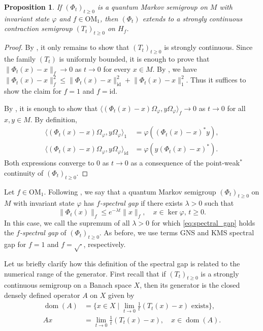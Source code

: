\documentclass[a4paper,12pt]{amsart}
\newcommand{\norm}[1]{\lVert#1\rVert}
\newcommand{\id}{\mathrm{id}}
\newcommand{\OM}{\mathrm{OM}}
\renewcommand{\phi}{\varphi}
\newcommand{\dom}{\operatorname{dom}}
\theoremstyle{plain}
\newtheorem{proposition}{Proposition}[section]
\theoremstyle{remark}
\theoremstyle{definition}
\begin{document}
\begin{proposition}\label{prop:C_0_ext}
    If $(\Phi_t)_{t\geq 0}$ is a quantum Markov semigroup on $M$ with invariant state $\phi$ and $f\in\OM_1$, then $(\Phi_t)$ extends to a strongly continuous contraction semigroup $(T_t)_{t\geq 0}$ on $H_f$.
\end{proposition}
\begin{proof}
    By , it only remains to show that $(T_t)_{t\geq 0}$ is strongly continuous. Since the family $(T_t)$ is uniformly bounded, it is enough to prove that $\norm{\Phi_t(x)-x}_f\to 0$ as $t\to 0$ for every $x\in M$. By , we have $\norm{\Phi_t(x)-x}_f^2\leq \norm{\Phi_t(x)-x}_{\id}^2+\norm{\Phi_t(x)-x}_{1}^2$. Thus it suffices to show the claim for $f=1$ and $f=\id$.

    By \cite[Theorem II.5.8]{EN00}, it is enough to show that $\langle (\Phi_t(x)-x)\Omega_\phi,y\Omega_\phi\rangle_f\to 0$ as $t\to 0$ for all $x,y\in M$. By definition, 
    \begin{align*}
        \langle (\Phi_t(x)-x)\Omega_\phi,y\Omega_\phi\rangle_1&=\phi((\Phi_t(x)-x)^\ast y),\\
        \langle (\Phi_t(x)-x)\Omega_\phi,y\Omega_\phi\rangle_\id&=\phi(y(\Phi_t(x)-x)^\ast).
    \end{align*}
    Both expressions converge to $0$ as $t\to 0$ as a consequence of the point-weak$^\ast$ continuity of $(\Phi_t)_{t\geq 0}$.
\end{proof}

Let $f\in\OM_1$. Following \cite{FPSU25}, we say that a quantum Markov semigroup $(\Phi_t)_{t\geq 0}$ on $M$ with invariant state $\phi$ has \emph{$f$-spectral gap} if there exists $\lambda>0$ such that
\begin{equation}\label{eq:spectral_gap}
    \norm{\Phi_t(x)}_f\leq e^{-\lambda t}\norm{x}_f,\quad x\in \ker\phi,\,t\geq 0.\tag{$\clubsuit$}
\end{equation}
In this case, we call the supremum of all $\lambda>0$ for which \eqref{eq:spectral_gap} holds the \emph{$f$-spectral gap} of $(\Phi_t)_{t\geq 0}$. As before, we use terms GNS and KMS spectral gap for $f=1$ and $f=\sqrt\cdot$, respectively.

Let us briefly clarify how this definition of the spectral gap is related to the numerical range of the generator. First recall that if $(T_t)_{t\geq 0}$ is a strongly continuous semigroup on a Banach space $X$, then its generator is the closed densely defined operator $A$ on $X$ given by
\begin{align*}
    \dom(A)&=\{x\in X\mid \lim_{t\to 0}\frac 1 t (T_t(x)-x)\text{ exists}\},\\
    Ax&=\lim_{t\to 0}\frac 1 t(T_t(x)-x),\quad x\in \dom(A).
\end{align*}
\end{document}
